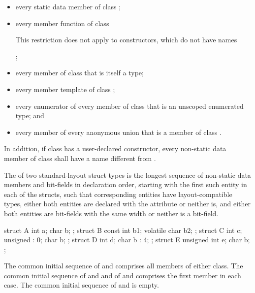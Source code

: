 \begin{itemize}
\item every static data member of class ;

\item every member function of class 
\begin{note}
This restriction does not apply to constructors, which do not have
names
\end{note};

\item every member of class  that is itself a type;

\item every member template of class ;

\item every enumerator of every member of class  that is an
unscoped enumerated type; and

\item every member of every anonymous union that is a member of class
.
\end{itemize}

\pnum
In addition, if class  has a user-declared
constructor, every non-static data member of class
 shall have a name different from .

\pnum
The  of two standard-layout struct
types is the longest sequence of non-static data
members and bit-fields in declaration order, starting with the first
such entity in each of the structs, such that corresponding entities
have layout-compatible types,
either both entities are declared with
the  attribute
or neither is,
and either both entities are bit-fields with the same width
or neither is a bit-field.
\begin{example}
\begin{codeblock}
  struct A { int a; char b; };
  struct B { const int b1; volatile char b2; };
  struct C { int c; unsigned : 0; char b; };
  struct D { int d; char b : 4; };
  struct E { unsigned int e; char b; };
\end{codeblock}
The common initial sequence of  and  comprises all members
of either class. The common initial sequence of  and  and
of  and  comprises the first member in each case.
The common initial sequence of  and  is empty.
\end{example}

